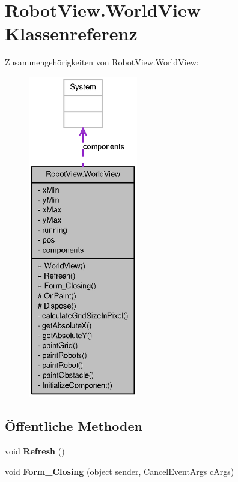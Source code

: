 \hypertarget{class_robot_view_1_1_world_view}{
\section{RobotView.WorldView Klassenreferenz}
\label{class_robot_view_1_1_world_view}
}


Zusammengehörigkeiten von RobotView.WorldView:\nopagebreak
\begin{figure}[H]
\begin{center}
\leavevmode
\includegraphics[height=400pt]{class_robot_view_1_1_world_view__coll__graph}
\end{center}
\end{figure}
\subsection*{Öffentliche Methoden}
\begin{DoxyCompactItemize}
\item 
\hypertarget{class_robot_view_1_1_world_view_a8b50c86f7991f081d0530e272e296623}{
void {\bfseries Refresh} ()}
\label{class_robot_view_1_1_world_view_a8b50c86f7991f081d0530e272e296623}

\item 
\hypertarget{class_robot_view_1_1_world_view_ada058516565c5905b624a62f42e81d00}{
void {\bfseries Form\_\-Closing} (object sender, CancelEventArgs cArgs)}
\label{class_robot_view_1_1_world_view_ada058516565c5905b624a62f42e81d00}

\end{DoxyCompactItemize}
